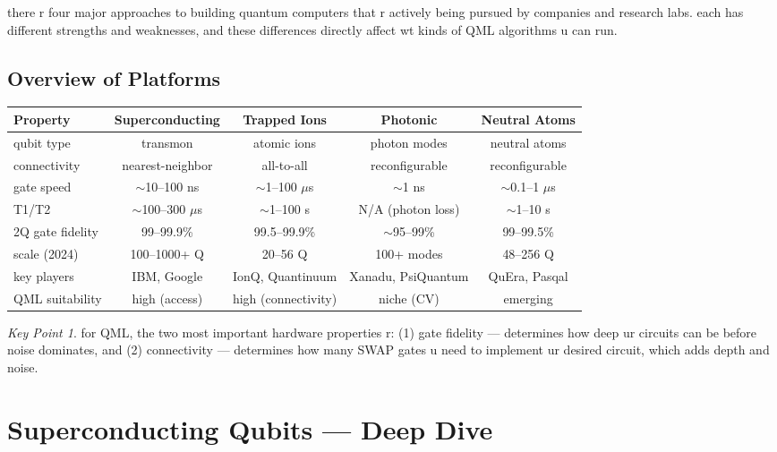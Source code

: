 \documentclass[11pt,a4paper]{article}
\theoremstyle{definition}
\theoremstyle{remark}
\newtheorem*{keypoint}{Key Point}
\begin{document}
there r four major approaches to building quantum computers that r actively being pursued by companies and research labs. each has different strengths and weaknesses, and these differences directly affect wt kinds of QML algorithms u can run.

\subsection{Overview of Platforms}

\begin{center}
\renewcommand{\arraystretch}{1.4}
\begin{tabular}{|l|c|c|c|c|}
\hline
\textbf{Property} & \textbf{Superconducting} & \textbf{Trapped Ions} & \textbf{Photonic} & \textbf{Neutral Atoms} \\
\hline
qubit type & transmon & atomic ions & photon modes & neutral atoms \\
\hline
connectivity & nearest-neighbor & all-to-all & reconfigurable & reconfigurable \\
\hline
gate speed & $\sim$10--100 ns & $\sim$1--100 $\mu$s & $\sim$1 ns & $\sim$0.1--1 $\mu$s \\
\hline
T1/T2 & $\sim$100--300 $\mu$s & $\sim$1--100 s & N/A (photon loss) & $\sim$1--10 s \\
\hline
2Q gate fidelity & 99--99.9\% & 99.5--99.9\% & $\sim$95--99\% & 99--99.5\% \\
\hline
scale (2024) & 100--1000+ Q & 20--56 Q & 100+ modes & 48--256 Q \\
\hline
key players & IBM, Google & IonQ, Quantinuum & Xanadu, PsiQuantum & QuEra, Pasqal \\
\hline
QML suitability & high (access) & high (connectivity) & niche (CV) & emerging \\
\hline
\end{tabular}
\end{center}

\begin{keypoint}
for QML, the two most important hardware properties r: (1) gate fidelity --- determines how deep ur circuits can be before noise dominates, and (2) connectivity --- determines how many SWAP gates u need to implement ur desired circuit, which adds depth and noise.
\end{keypoint}

\section{Superconducting Qubits --- Deep Dive}
\end{document}
